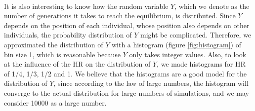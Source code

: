 \\
It is also interesting to know how the random variable $Y$, which we denote as the number of generations it takes to reach the equilibrium, is distributed. Since $Y$ depends on the position of each individual, whose position also depends on other individuals, the probability distribution of $Y$ might be complicated. Therefore, we approximated the distribution of $Y$ with a histogram (figure \ref{fig:histogram}) of bin size 1, which is reasonable because $Y$ only takes integer values. Also, to look at the influence of the HR on the distribution of $Y$, we made histograms for HR of 1/4, 1/3, 1/2 and 1.  We believe that the histograms are a good model for the distribution of $Y$, since according to the law of large numbers, the histogram will converge to the actual distribution for large numbers of simulations, and we may consider 10000 as a large number.\\
\\
 
